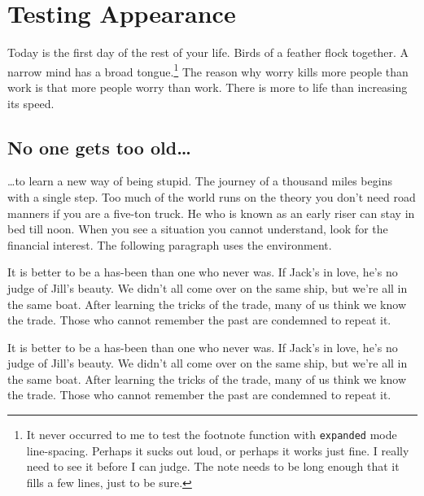 
\chapter{Testing Appearance}

Today is the first day of the rest of your life.  Birds of a feather
flock together. A narrow mind has a broad tongue.\footnote{It never
  occurred to me to test the footnote function with \texttt{expanded}
  mode line-spacing.  Perhaps it sucks out loud, or perhaps it works
  just fine.  I really need to see it before I can judge. The note
  needs to be long enough that it fills a few lines, just to be sure.}
The reason why worry kills more people than work is that more people
worry than work.  There is more to life than increasing its speed.

\section{No one gets too old\ldots}
\ldots to learn a new way of being stupid.  The journey of a thousand
miles begins with a single step.  Too much of the world runs on the
theory you don't need road manners if you are a five-ton truck.  He
who is known as an early riser can stay in bed till noon.  When you
see a situation you cannot understand, look for the financial
interest.  The following paragraph uses the 
environment.

\begin{singlespaced}
It is better to be a has-been than one who never was.  If Jack's in
love, he's no judge of Jill's beauty.  We didn't all come over on the
same ship, but we're all in the same boat.  After learning the tricks
of the trade, many of us think we know the trade.  Those who cannot
remember the past are condemned to repeat it.
\end{singlespaced}
It is better to be a has-been than one who never was.  If Jack's in
love, he's no judge of Jill's beauty.  We didn't all come over on the
same ship, but we're all in the same boat.  After learning the tricks
of the trade, many of us think we know the trade.  Those who cannot
remember the past are condemned to repeat it.

